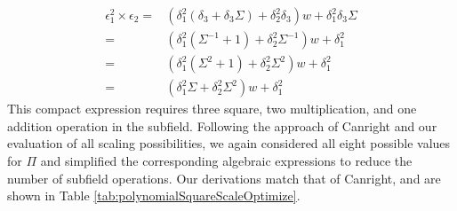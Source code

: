 \begin{align*}
\epsilon_1^2 \times \epsilon_2 = & (\delta_1^2(\delta_3 + \delta_3\Sigma) + \delta_2^2\delta_3)w + \delta_1^2\delta_3\Sigma \\
= & (\delta_1^2(\Sigma^{-1} + 1) + \delta_2^2\Sigma^{-1})w + \delta_1^2 \\
= & (\delta_1^2(\Sigma^2 + 1) + \delta_2^2\Sigma^2)w + \delta_1^2 \\
= & (\delta_1^2\Sigma + \delta_2^2\Sigma^2)w + \delta_1^2
\end{align*}
This compact expression requires three square, two multiplication, and one addition operation in the subfield. Following the approach of Canright \cite{Canright05-1} and our evaluation of all scaling possibilities, we again considered all eight possible values for $\Pi$ and simplified the corresponding algebraic expressions to reduce the number of subfield operations. Our derivations match that of Canright, and are shown in Table \ref{tab:polynomialSquareScaleOptimize}.

